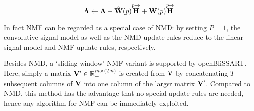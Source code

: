\begin{equation}
    \label{math:LambdaUpdate}
    \mathbf{\Lambda} \leftarrow \mathbf{\Lambda} - \hat{\mathbf{W}}(p) \overset{p \rightarrow}{\mathbf{H}} + \mathbf{W}(p) \overset{p \rightarrow}{\mathbf{H}}
\end{equation}

In fact NMF can be regarded as a special case of NMD: by setting $P=1$, the
convolutive signal model as well as the NMD update rules reduce to the linear
signal model and NMF update rules, respectively.

Besides NMD, a `sliding window' NMF variant \cite{Gemmeke2010} is supported by
openBliSSART. Here, simply a matrix $\mathbf{V}' \in \mathbb{R}_+^{m \times (Tn)}$ is
created from $\mathbf{V}$ by concatenating $T$ subsequent columns of $\mathbf{V}$
into one column of the larger matrix $\mathbf{V}'$. Compared to NMD, this method
has the advantage that no special update rules are needed, hence any algorithm
for NMF can be immediately exploited.

